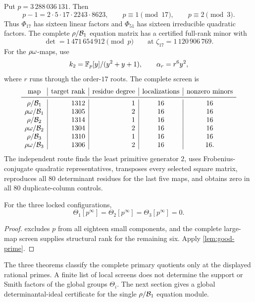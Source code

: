 Put \(p=3\,288\,036\,131\).  Then
\[
 p-1=2\cdot5\cdot17\cdot2243\cdot8623,
 \qquad p\equiv1\pmod {17},\qquad p\equiv2\pmod3.
\]
Thus \(\Phi_{17}\) has sixteen linear factors and \(\Phi_{51}\) has
sixteen irreducible quadratic factors.  The complete
\(\rho/\mathcal B_1\) equation matrix has a certified full-rank minor with
\[
 \det=1\,471\,654\,912\pmod p
 \qquad\text{at }\zeta_{17}=1\,120\,906\,769.
\]
For the \(\rho\omega\)-maps, use
\[
 k_2=\mathbb F_p[y]/(y^2+y+1),\qquad \alpha_r=r^6y^2,
\]
where \(r\) runs through the order-\(17\) roots.  The complete screen is
\[
\begin{array}{c|r|r|c|c}
\text{map}&\text{target rank}&\text{residue degree}&
 \text{localizations}&\text{nonzero minors}\\
\midrule
\rh/\cB_1&1312&1&16&16\\
\rh\om/\cB_1&1305&2&16&16\\
\rh/\cB_2&1314&1&16&16\\
\rh\om/\cB_2&1304&2&16&16\\
\rh/\cB_3&1310&1&16&16\\
\rh\om/\cB_3&1306&2&16&16.
\end{array}
\]
The independent route finds the least primitive generator \(2\), uses
Frobenius-conjugate quadratic representatives, transposes every selected
square matrix, reproduces all \(80\) determinant residues for the last
five maps, and obtains zero in all \(80\) duplicate-column controls.

\begin{theorem}
\label{thm:theta3288036131}
For the three locked configurations,
\[
 \Theta_1[p^\infty]=\Theta_2[p^\infty]=\Theta_3[p^\infty]=0.
\]
\end{theorem}

\begin{proof}
 excludes \(p\) from all eighteen small
components, and the complete large-map screen supplies structural rank
for the remaining six.  Apply \cref{lem:good-prime}.
\end{proof}

\begin{remark}
The three theorems classify the complete primary quotients only at the
displayed rational primes.  A finite list of local screens does not
determine the support or Smith factors of the global groups
\(\Theta_i\).  The next section gives a global determinantal-ideal
certificate for the single \(\rho/\mathcal B_1\) equation module.
\end{remark}

